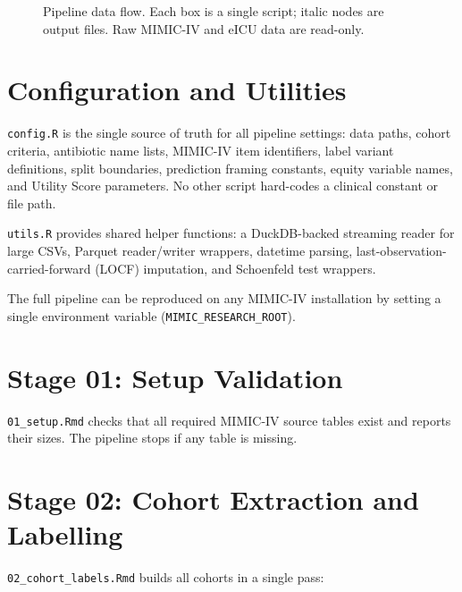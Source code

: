\begin{figure}[H]
    \caption{Pipeline data flow. Each box is a single script; italic nodes are
    output files. Raw MIMIC-IV and eICU data are read-only.}
    \label{fig:pipeline_dag}
\end{figure}


\section{Configuration and Utilities}

\texttt{config.R} is the single source of truth for all pipeline settings:
data paths, cohort criteria, antibiotic name lists, MIMIC-IV item identifiers,
label variant definitions, split boundaries, prediction framing constants,
equity variable names, and Utility Score parameters. No other script hard-codes
a clinical constant or file path.

\texttt{utils.R} provides shared helper functions: a DuckDB-backed streaming
reader for large CSVs, Parquet reader/writer wrappers, datetime parsing,
last-observation-carried-forward (LOCF) imputation, and Schoenfeld test
wrappers.

The full pipeline can be reproduced on any MIMIC-IV installation by setting a
single environment variable (\texttt{MIMIC\_RESEARCH\_ROOT}).


\section{Stage 01: Setup Validation}

\texttt{01\_setup.Rmd} checks that all required MIMIC-IV source tables exist
and reports their sizes. The pipeline stops if any table is missing.


\section{Stage 02: Cohort Extraction and Labelling}

\texttt{02\_cohort\_labels.Rmd} builds all cohorts in a single pass:

